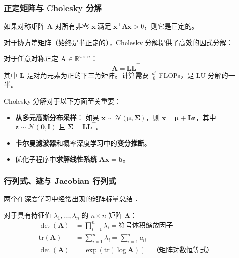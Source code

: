 \subsubsection{正定矩阵与 Cholesky 分解}

\begin{定义}[正定]
如果对称矩阵 $\mathbf{A}$ 对所有非零 $\mathbf{x}$ 满足 $\mathbf{x}^\top \mathbf{A}\mathbf{x} > 0$，则它是正定的。
\end{定义}

对于协方差矩阵（始终是半正定的），Cholesky 分解提供了高效的因式分解：

\begin{定理}[Cholesky 分解]
对于任意对称正定 $\mathbf{A} \in \mathbb{R}^{n \times n}$：
\begin{equation}
\mathbf{A} = \mathbf{L}\mathbf{L}^\top
\end{equation}
其中 $\mathbf{L}$ 是对角元素为正的下三角矩阵。计算需要 $\frac{n^3}{6}$ FLOPs，是 LU 分解的一半。
\end{定理}

Cholesky 分解对于以下方面至关重要：
\begin{itemize}
    \item \textbf{从多元高斯分布采样：} 如果 $\mathbf{x} \sim \mathcal{N}(\boldsymbol{\mu}, \boldsymbol{\Sigma})$，则 $\mathbf{x} = \boldsymbol{\mu} + \mathbf{L}\mathbf{z}$，其中 $\mathbf{z} \sim \mathcal{N}(\mathbf{0}, \mathbf{I})$ 且 $\boldsymbol{\Sigma} = \mathbf{L}\mathbf{L}^\top$。
    \item \textbf{卡尔曼滤波器}和概率深度学习中的\textbf{变分推断}。
    \item 优化子程序中\textbf{求解线性系统} $\mathbf{A}\mathbf{x} = \mathbf{b}$。
\end{itemize}

\subsubsection{行列式、迹与 Jacobian 行列式}

两个在深度学习中经常出现的矩阵标量总结：

\begin{性质}[关键矩阵性质]
对于具有特征值 $\lambda_1, \ldots, \lambda_n$ 的 $n \times n$ 矩阵 $\mathbf{A}$：
\begin{align}
\det(\mathbf{A}) &= \prod_{i=1}^{n} \lambda_i = \text{符号体积缩放因子} \\
\text{tr}(\mathbf{A}) &= \sum_{i=1}^{n} \lambda_i = \sum_{i=1}^{n} a_{ii} \\
\det(\mathbf{A}) &= \exp(\text{tr}(\log \mathbf{A})) \quad \text{（矩阵对数恒等式）}
\end{align}
\end{性质}

